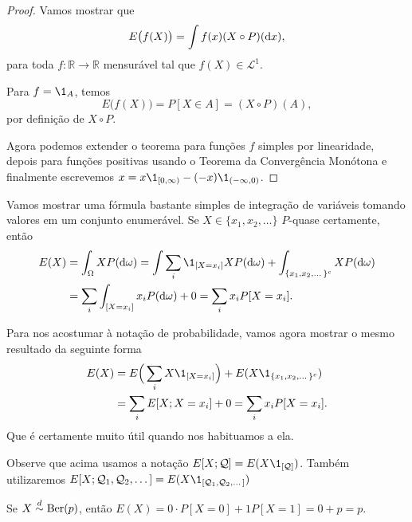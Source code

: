 \begin{proof}
  Vamos mostrar que
  \begin{equation}
    E\big(f(X)\big) = \int f(x) (X \circ P) (\mathop{}\!\mathrm{d} x),
  \end{equation}
  para toda $f: \mathbb{R} \to \mathbb{R}$ mensurável tal que $f(X) \in \mathcal{L}^1$.

  Para $f = \1_A$, temos
  \begin{equation}
    E\big(f(X)\big) = P[X \in A] = (X \circ P) (A),
  \end{equation}
  por definição de $X \circ P$.

  Agora podemos extender o teorema para funções $f$ simples por linearidade, depois para funções positivas usando o Teorema da Convergência Monótona e finalmente escrevemos $x = x \1_{[0, \infty)} - (-x) \1_{(-\infty,0)}$.
\end{proof}

Vamos mostrar uma fórmula bastante simples de integração de variáveis tomando valores em um conjunto enumerável.
Se $X \in \{x_1, x_2, \dots\}$ $P$-quase certamente, então
\begin{equation}
  \begin{split}
    E(X) & = \int_\Omega X P(\d \omega) = \int \sum_i \1_{[X = x_i]} X P(\d \omega) + \int_{\{x_1, x_2, \dots\}^c} X P(\d \omega)\\
    & = \sum_i \int_{[X = x_i]} x_i P(\d \omega) + 0 = \sum_i x_i P[X = x_i].
  \end{split}
\end{equation}

Para nos acostumar à notação de probabilidade, vamos agora mostrar o mesmo resultado da seguinte forma
\begin{equation}
  \begin{split}
    E(X) & = E\Big(\sum_i X \1_{[X = x_i]}\Big) + E(X \1_{\{x_1, x_2, \dots\}^c})\\
    & = \sum_i E[X; X = x_i] + 0 = \sum_i x_i P[X = x_i].
  \end{split}
\end{equation}
Que é certamente muito útil quando nos habituamos a ela.

Observe que acima usamos a notação $E[X; \mathcal{Q}] = E(X \1_{[\mathcal{Q}]})$.
Também utilizaremos $E[X; \mathcal{Q}_1, \mathcal{Q}_2, \dots] = E(X \1_{[\mathcal{Q}_1, \mathcal{Q}_2, \dots]})$

\begin{example}
  Se $X \overset{d}\sim \operatorname{Ber}(p)$, então $E(X) = 0 \cdot P[X = 0] + 1 P[X = 1] = 0 + p = p$.
\end{example}

